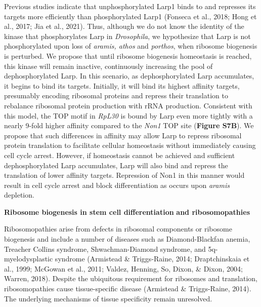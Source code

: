 \documentclass[12pt,twoside]{reedthesis}
\begin{document}
Previous studies indicate that unphosphorylated Larp1 binds to and
represses its targets more efficiently than phosphorylated Larp1
(Fonseca et al., 2018; Hong et al., 2017; Jia et al., 2021). Thus, although we do not know the identity
of the kinase that phosphorylates Larp in \emph{Drosophila}, we hypothesize
that Larp is not phosphorylated upon loss of \emph{aramis, athos} and
\emph{porthos}, when ribosome biogenesis is perturbed. We propose that until
ribosome biogenesis homeostasis is reached, this kinase will remain
inactive, continuously increasing the pool of dephosphorylated Larp. In
this scenario, as dephosphorylated Larp accumulates, it begins to bind
its targets. Initially, it will bind its highest affinity targets,
presumably encoding ribosomal proteins and repress their translation to
rebalance ribosomal protein production with rRNA production. Consistent
with this model, the TOP motif in \emph{RpL30} is bound by Larp even more
tightly with a nearly 9-fold higher affinity compared to the \emph{Non1} TOP
site (\textbf{Figure S7B}). We propose that such differences in affinity may
allow Larp to repress ribosomal protein translation to facilitate
cellular homeostasis without immediately causing cell cycle arrest.
However, if homeostasis cannot be achieved and sufficient
dephosphorylated Larp accumulates, Larp will also bind and repress the
translation of lower affinity targets. Repression of Non1 in this manner
would result in cell cycle arrest and block differentiation as occurs
upon \emph{aramis} depletion.

\textbf{Ribosome biogenesis in stem cell differentiation} \textbf{and
ribosomopathies}

Ribosomopathies arise from defects in ribosomal components or ribosome
biogenesis and include a number of diseases such as Diamond-Blackfan
anemia, Treacher Collins syndrome, Shwachman-Diamond syndrome, and
5q-myelodysplastic syndrome (Armistead \& Triggs-Raine, 2014; Draptchinskaia et al., 1999; McGowan et al., 2011; Valdez, Henning, So, Dixon, \& Dixon, 2004; Warren, 2018).
Despite the ubiquitous requirement for ribosomes and translation,
ribosomopathies cause tissue-specific disease (Armistead \& Triggs-Raine, 2014). The
underlying mechanisms of tissue specificity remain unresolved.
\end{document}
